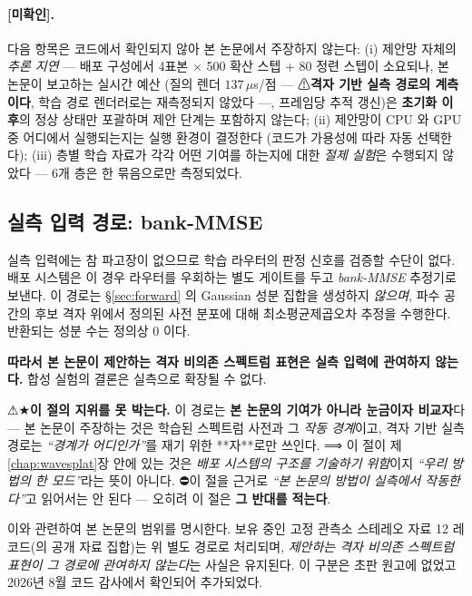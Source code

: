 \documentclass[11pt]{report}
\numberwithin{equation}{chapter}
\numberwithin{figure}{chapter}
\numberwithin{table}{chapter}
\begin{document}
\paragraph{[미확인].}
다음 항목은 코드에서 확인되지 않아 본 논문에서 주장하지 않는다:
(i) 제안망 자체의 \emph{추론 지연} --- 배포 구성에서 4표본 $\times$ 500 확산 스텝 +
80 정련 스텝이 소요되나, 본 논문이 보고하는 실시간 예산
(질의 렌더 $137\,\mu$s/점 --- ⚠\textbf{격자 기반 실측 경로의 계측이다}, 학습 경로
렌더러로는 재측정되지 않았다 ---, 프레임당 추적 갱신)은 \textbf{초기화 이후}의 정상 상태만
포괄하며 제안 단계는 포함하지 않는다;
(ii) 제안망이 CPU 와 GPU 중 어디에서 실행되는지는 실행 환경이 결정한다
(코드가 가용성에 따라 자동 선택한다);
(iii) 층별 학습 자료가 각각 어떤 기여를 하는지에 대한 \emph{절제 실험}은 수행되지 않았다 ---
6개 층은 한 묶음으로만 측정되었다.

\subsection{실측 입력 경로: bank-MMSE}
\label{sec:init-bank}

실측 입력에는 참 파고장이 없으므로 학습 라우터의 판정 신호를 검증할 수단이 없다.
배포 시스템은 이 경우 라우터를 우회하는 별도 게이트를 두고 \emph{bank-MMSE} 추정기로
보낸다. 이 경로는 \S\ref{sec:forward} 의 Gaussian 성분 집합을 생성하지 \emph{않으며},
파수 공간의 후보 격자 위에서 정의된 사전 분포에 대해 최소평균제곱오차 추정을 수행한다.
반환되는 성분 수는 정의상 $0$ 이다.

\textbf{따라서 본 논문이 제안하는 격자 비의존 스펙트럼 표현은 실측 입력에 관여하지 않는다.}
합성 실험의 결론은 실측으로 확장될 수 없다.

⚠★\textbf{이 절의 지위를 못 박는다.} 이 경로는 \textbf{본 논문의 기여가 아니라 눈금이자
비교자}다 --- 본 논문이 주장하는 것은 학습된 스펙트럼 사전과 그 \emph{작동 경계}이고,
격자 기반 실측 경로는 \emph{``경계가 어디인가''}를 재기 위한 **자**로만 쓰인다.
⟹ 이 절이 제\ref{chap:wavesplat}장 안에 있는 것은 \emph{배포 시스템의 구조를 기술하기
위함}이지 \emph{``우리 방법의 한 모드''}라는 뜻이 아니다. ⛔이 절을 근거로
\emph{``본 논문의 방법이 실측에서 작동한다''}고 읽어서는 안 된다 --- 오히려 이 절은
\textbf{그 반대를 적는다}.

이와 관련하여 본 논문의 범위를 명시한다. 보유 중인 고정 관측소 스테레오 자료
12 레코드(\citet{Guimaraes2020Dataset}의 공개 자료 집합)는
위 별도 경로로 처리되며, \emph{제안하는 격자 비의존 스펙트럼 표현이 그 경로에 관여하지 않는다}는
사실은 유지된다. 이 구분은 초판 원고에 없었고 2026년 8월 코드 감사에서 확인되어 추가되었다.
\end{document}
